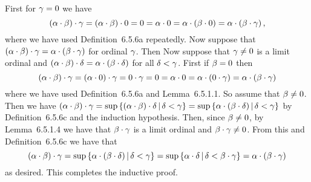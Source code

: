 \begin{solution}
    First for $\gamma=0$ we have
    $$
    (\alpha \cdot \beta) \cdot \gamma = (\alpha \cdot \beta) \cdot 0 = 0 = \alpha \cdot 0 = \alpha \cdot (\beta \cdot 0) = \alpha \cdot (\beta \cdot \gamma) \,,
    $$
    where we have used Definition~6.5.6a repeatedly.
    Now suppose that $(\alpha \cdot \beta) \cdot \gamma = \alpha \cdot (\beta \cdot \gamma)$ for ordinal $\gamma$.
    Then
    Now suppose that $\gamma \neq 0$ is a limit ordinal and $(\alpha \cdot \beta) \cdot \delta = \alpha \cdot (\beta \cdot \delta)$ for all $\delta < \gamma$.
    First if $\beta = 0$ then
    $$
    (\alpha \cdot \beta) \cdot \gamma = (\alpha \cdot 0) \cdot \gamma = 0 \cdot \gamma = 0 = \alpha \cdot 0 = \alpha \cdot (0 \cdot \gamma) = \alpha \cdot (\beta \cdot \gamma)
    $$
    where we have used Definition~6.5.6a and Lemma~6.5.1.1.
    So assume that $\beta \neq 0$.
    Then we have $(\alpha \cdot \beta) \cdot \gamma = \sup\left\{ (\alpha \cdot \beta) \cdot \delta \,|\, \delta < \gamma \right\} = \sup\left\{ \alpha \cdot (\beta \cdot \delta) \,|\, \delta < \gamma \right\}$ by Definition~6.5.6c and the induction hypothesis.
    Then, since $\beta \neq 0$, by Lemma~6.5.1.4 we have that $\beta \cdot \gamma$ is a limit ordinal and $\beta \cdot \gamma \neq 0$.
    From this and Definition~6.5.6c we have that
    $$
    (\alpha \cdot \beta) \cdot \gamma = \sup\left\{ \alpha \cdot (\beta \cdot \delta) \,|\, \delta < \gamma \right\} = \sup\left\{ \alpha \cdot \delta \,|\, \delta < \beta \cdot \gamma \right\} = \alpha \cdot (\beta \cdot \gamma)
    $$
    as desired.
    This completes the  inductive proof. \qedsymbol
\end{solution}


